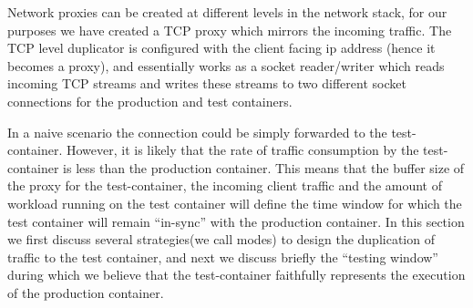 Network proxies can be created at different levels in the network stack, for our purposes we have created a TCP proxy which mirrors the incoming traffic.
The TCP level duplicator is configured with the client facing ip address (hence it becomes a proxy), and essentially works as a socket reader/writer which reads incoming TCP streams and writes these streams to two different socket connections for the production and test containers.

In a naive scenario the connection could be simply forwarded to the test-container. 
However, it is likely that the rate of traffic consumption by the test-container is less than the production container. 
This means that the buffer size of the proxy for the test-container, the incoming client traffic and the amount of workload running on the test container will define the time window for which the test container will remain ``in-sync'' with the production container.
In this section we first discuss several strategies(we call modes) to design the duplication of traffic to the test container, and next we discuss briefly the ``testing window'' during which we believe that the test-container faithfully represents the execution of the production container. 

